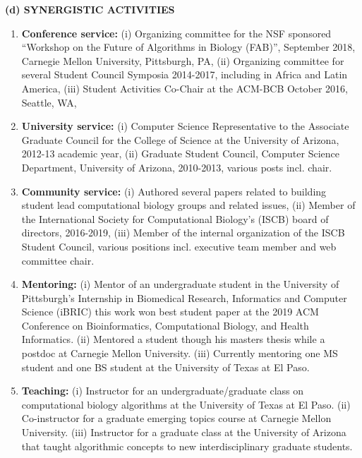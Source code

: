 \documentclass{nsfbiosketch}
\begin{document}
\textbf{(d) SYNERGISTIC ACTIVITIES}\\[5pt]
\vspace{-1.5em}
\begin{enumerate}
\item \textbf{Conference service:} (i) Organizing committee for the NSF sponsored “Workshop on the Future of Algorithms in Biology (FAB)”, September 2018, Carnegie Mellon University, Pittsburgh, PA, (ii) Organizing committee for several Student Council Symposia 2014-2017, including in Africa and Latin America, (iii) Student Activities Co-Chair at the ACM-BCB October 2016, Seattle, WA,

\item \textbf{University service:} (i) Computer Science Representative to the Associate Graduate Council for the College of Science at the University of Arizona, 2012-13 academic year, (ii) Graduate Student Council, Computer Science Department, University of Arizona, 2010-2013, various posts incl. chair.

\item \textbf{Community service:} (i) Authored several papers related to building student lead computational biology groups and related issues, (ii) Member of the International Society for Computational Biology’s (ISCB) board of directors, 2016-2019, (iii) Member of the internal organization of the ISCB Student Council, various positions incl. executive team member and web committee chair.

\item \textbf{Mentoring:} (i) Mentor of an undergraduate student in the University of Pittsburgh’s Internship in Biomedical Research, Informatics and Computer Science (iBRIC) this work won best student paper at the 2019 ACM Conference on Bioinformatics, Computational Biology, and Health Informatics. (ii) Mentored a student though his masters thesis while a postdoc at Carnegie Mellon University. (iii) Currently mentoring one MS student and one BS student at the University of Texas at El Paso.

\item \textbf{Teaching:} (i) Instructor for an undergraduate/graduate class on computational biology algorithms at the University of Texas at El Paso. (ii) Co-instructor for a graduate emerging topics course at Carnegie Mellon University. (iii) Instructor for a graduate class at the University of Arizona that taught algorithmic concepts to new interdisciplinary graduate students.
\end{enumerate}
\end{document}
